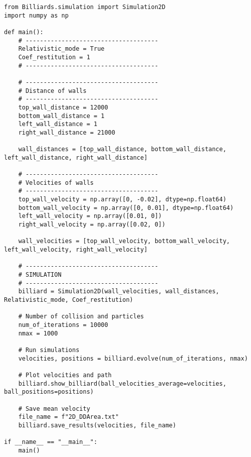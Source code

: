\begin{lstlisting}[breaklines]
from Billiards.simulation import Simulation2D
import numpy as np

def main():
    # -------------------------------------
    Relativistic_mode = True
    Coef_restitution = 1
    # -------------------------------------

    # -------------------------------------
    # Distance of walls
    # -------------------------------------
    top_wall_distance = 12000
    bottom_wall_distance = 1
    left_wall_distance = 1
    right_wall_distance = 21000

    wall_distances = [top_wall_distance, bottom_wall_distance, left_wall_distance, right_wall_distance]

    # -------------------------------------
    # Velocities of walls
    # -------------------------------------
    top_wall_velocity = np.array([0, -0.02], dtype=np.float64)
    bottom_wall_velocity = np.array([0, 0.01], dtype=np.float64)
    left_wall_velocity = np.array([0.01, 0])
    right_wall_velocity = np.array([0.02, 0])

    wall_velocities = [top_wall_velocity, bottom_wall_velocity, left_wall_velocity, right_wall_velocity]

    # -------------------------------------
    # SIMULATION
    # -------------------------------------
    billiard = Simulation2D(wall_velocities, wall_distances, Relativistic_mode, Coef_restitution)

    # Number of collision and particles
    num_of_iterations = 10000
    nmax = 1000

    # Run simulations
    velocities, positions = billiard.evolve(num_of_iterations, nmax)

    # Plot velocities and path
    billiard.show_billiard(ball_velocities_average=velocities, ball_positions=positions)
    
    # Save mean velocity
    file_name = f"2D_DDArea.txt"
    billiard.save_results(velocities, file_name)

if __name__ == "__main__":
    main()
\end{lstlisting}

